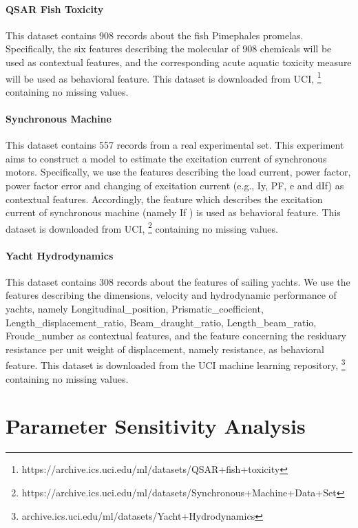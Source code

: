 \documentclass[pdflatex,sn-basic]{sn-jnl}%
\theoremstyle{thmstyleone}%
\theoremstyle{thmstyletwo}%
\theoremstyle{thmstylethree}%
\begin{document}
\begin{appendices}
\paragraph{QSAR Fish Toxicity} This dataset contains 908 records about the fish Pimephales promelas. Specifically, the six features describing the molecular of 908 chemicals will be used as contextual features, and the corresponding acute aquatic toxicity measure will be used as behavioral feature. This dataset is downloaded from UCI, \footnote{https://archive.ics.uci.edu/ml/datasets/QSAR+fish+toxicity} containing no missing values.

\paragraph{Synchronous Machine } This dataset contains 557 records from a real experimental set. This experiment aims to construct a model to estimate the excitation current of synchronous motors. Specifically, we use the features describing the load current, power factor, power factor error and changing of excitation current (e.g., Iy, PF, e and dIf) as contextual features. Accordingly, the feature which describes
the excitation current of synchronous machine (namely If ) is used as behavioral feature. This dataset is downloaded from UCI, \footnote{https://archive.ics.uci.edu/ml/datasets/Synchronous+Machine+Data+Set} containing no missing values.


\paragraph{Yacht Hydrodynamics } This dataset contains 308 records about the features of sailing yachts. We use the features describing the dimensions, velocity and hydrodynamic performance of yachts, namely Longitudinal\_position, Prismatic\_coefficient, Length\_displacement\_ratio, Beam\_draught\_ratio, Length\_beam\_ratio, Froude\_number as contextual features, and the feature concerning the residuary resistance per unit weight of displacement, namely resistance, as behavioral feature. This dataset is downloaded from the UCI machine learning repository, \footnote{archive.ics.uci.edu/ml/datasets/Yacht+Hydrodynamics} containing no missing values.

\section{Parameter Sensitivity Analysis}
\label{Appendix:Sensitivity}


\end{appendices}
\end{document}
